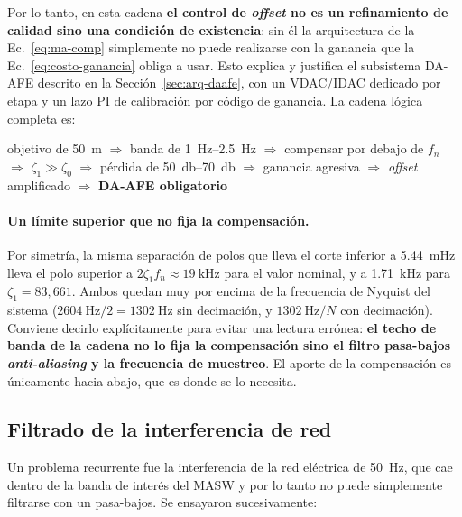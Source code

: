 Por lo tanto, en esta cadena \textbf{el control de \emph{offset} no es un refinamiento de
calidad sino una condici\'on de existencia}: sin \'el la arquitectura de la
Ec.~\eqref{eq:ma-comp} simplemente no puede realizarse con la ganancia que la
Ec.~\eqref{eq:costo-ganancia} obliga a usar. Esto explica y justifica el subsistema
DA-AFE descrito en la Secci\'on~\ref{sec:arq-daafe}, con un VDAC/IDAC dedicado por etapa y
un lazo PI de calibraci\'on por c\'odigo de ganancia. La cadena l\'ogica completa es:

\begin{center}\footnotesize
objetivo de \SI{50}{\meter} $\Rightarrow$ banda de \SIrange{1}{2.5}{\hertz}
$\Rightarrow$ compensar por debajo de $f_n$ $\Rightarrow$ $\zeta_1\gg\zeta_0$
$\Rightarrow$ p\'erdida de \SIrange{50}{70}{\decibel} $\Rightarrow$ ganancia agresiva
$\Rightarrow$ \emph{offset} amplificado $\Rightarrow$ \textbf{DA-AFE obligatorio}
\end{center}

\paragraph{Un l\'imite superior que no fija la compensaci\'on.} Por simetr\'ia, la misma
separaci\'on de polos que lleva el corte inferior a \SI{5.44}{\milli\hertz} lleva el polo
superior a $2\zeta_1 f_n\approx\SI{19}{\kilo\hertz}$ para el valor nominal, y a
\SI{1.71}{\kilo\hertz} para $\zeta_1=83{,}661$. Ambos quedan muy por encima de la
frecuencia de Nyquist del sistema ($\SI{2604}{\hertz}/2=\SI{1302}{\hertz}$ sin
decimaci\'on, y $\SI{1302}{\hertz}/N$ con decimaci\'on). Conviene decirlo
expl\'icitamente para evitar una lectura err\'onea:
\textbf{el techo de banda de la cadena no lo fija la compensaci\'on sino el filtro
pasa-bajos \emph{anti-aliasing} y la frecuencia de muestreo}. El aporte de la
compensaci\'on es \'unicamente hacia abajo, que es donde se lo necesita.

\subsection{Filtrado de la interferencia de red}

Un problema recurrente fue la interferencia de la red el\'ectrica de \SI{50}{\hertz}, que
cae dentro de la banda de inter\'es del MASW y por lo tanto no puede simplemente filtrarse
con un pasa-bajos. Se ensayaron sucesivamente:

